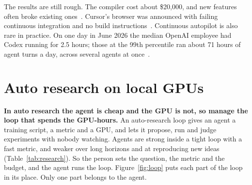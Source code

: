 \documentclass[11pt,letterpaper]{article}
\newcommand{\takeaway}[1]{\textbf{#1}}
\begin{document}
The results are still rough. The compiler cost about \$20,000, and new features often broke
existing ones~\cite{carlini}. Cursor's browser was announced with failing continuous
integration and no build instructions~\cite{willison}. Continuous autopilot is also rare in
practice. On one day in June 2026 the median OpenAI employee had Codex running for 2.5 hours;
those at the 99th percentile ran about 71 hours of agent turns a day, across several agents at
once~\cite{codex}.

\section{Auto research on local GPUs}\label{sec:gpu}

\takeaway{In auto research the agent is cheap and the GPU is not, so manage the loop that
spends the GPU-hours.} An auto-research loop gives an agent a training script, a metric and a
GPU, and lets it propose, run and judge experiments with nobody watching. Agents are strong
inside a tight loop with a fast metric, and weaker over long horizons and at reproducing new
ideas (Table~\ref{tab:research}). So the
person sets the question, the metric and the budget, and the agent runs the loop.
Figure~\ref{fig:loop} puts each part of the loop in its place. Only one part belongs to the
agent.
\end{document}
